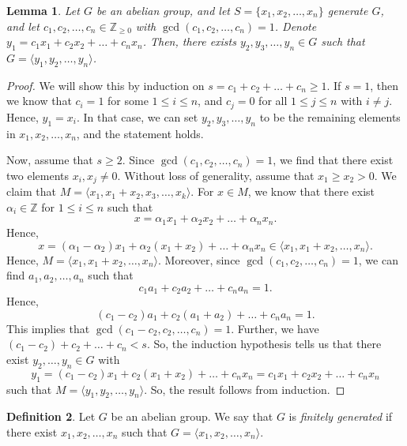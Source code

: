 \documentclass[a4paper, openany]{memoir}
\theoremstyle{definition}
\newtheorem{definition}{Definition}[section]
\theoremstyle{plain}
\newtheorem{lemma}[definition]{Lemma}
\begin{document}
    \begin{lemma}
        Let $G$ be an abelian group, and let $S = \{x_1, x_2, \dots, x_n\}$ generate $G$, and let $c_1, c_2, \dots, c_n \in \mathbb{Z}_{\geq 0}$ with $\gcd(c_1, c_2, \dots, c_n) = 1$. Denote $y_1 = c_1x_1 + c_2x_2 + \dots + c_nx_n$. Then, there exists $y_2, y_3, \dots, y_n \in G$ such that $G = \langle y_1, y_2, \dots, y_n \rangle$.
    \end{lemma}
    \begin{proof}
        We will show this by induction on $s = c_1 + c_2 + \dots + c_n \geq 1$. If $s = 1$, then we know that $c_i = 1$ for some $1 \leq i \leq n$, and $c_j = 0$ for all $1 \leq j \leq n$ with $i \neq j$. Hence, $y_1 = x_i$. In that case, we can set $y_2, y_3, \dots, y_n$ to be the remaining elements in $x_1, x_2, \dots, x_n$, and the statement holds. 
        
        Now, assume that $s \geq 2$. Since $\gcd(c_1, c_2, \dots, c_n) = 1$, we find that there exist two elements $x_i, x_j \neq 0$. Without loss of generality, assume that $x_1 \geq x_2 > 0$. We claim that $M = \langle x_1, x_1 + x_2, x_3, \dots, x_k \rangle$. For $x \in M$, we know that there exist $\alpha_i \in \mathbb{Z}$ for $1 \leq i \leq n$ such that
        \[x = \alpha_1 x_1 + \alpha_2 x_2 + \dots + \alpha_n x_n.\]
        Hence,
        \[x = (\alpha_1 - \alpha_2) x_1 + \alpha_2 (x_1 + x_2) + \dots + \alpha_n x_n \in \langle x_1, x_1 + x_2, \dots, x_n \rangle.\]
        Hence, $M = \langle x_1, x_1 + x_2, \dots, x_n \rangle$. Moreover, since $\gcd(c_1, c_2, \dots, c_n) = 1$, we can find $a_1, a_2, \dots, a_n$ such that
        \[c_1 a_1 + c_2 a_2 + \dots + c_n a_n = 1.\]
        Hence,
        \[(c_1 - c_2) a_1 + c_2 (a_1 + a_2) + \dots + c_n a_n = 1.\]
        This implies that $\gcd(c_1 - c_2, c_2, \dots, c_n) = 1$. Further, we have $(c_1 - c_2) + c_2 + \dots + c_n < s$. So, the induction hypothesis tells us that there exist $y_2, \dots, y_n \in G$ with
        \[y_1 = (c_1 - c_2) x_1 + c_2 (x_1 + x_2) + \dots + c_n x_n = c_1 x_1 + c_2 x_2 + \dots + c_n x_n\]
        such that $M = \langle y_1, y_2, \dots, y_n \rangle$. So, the result follows from induction.
    \end{proof}

    \begin{definition}
        Let $G$ be an abelian group. We say that $G$ is \emph{finitely generated} if there exist $x_1, x_2, \dots, x_n$ such that $G = \langle x_1, x_2, \dots, x_n \rangle$.
    \end{definition}
\end{document}
